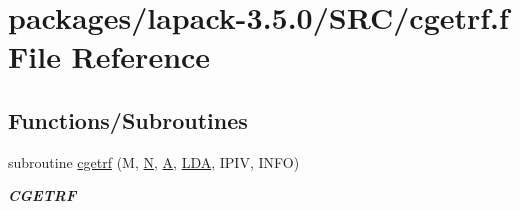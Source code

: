 \hypertarget{cgetrf_8f}{}\section{packages/lapack-\/3.5.0/\+S\+R\+C/cgetrf.f File Reference}
\label{cgetrf_8f}
\subsection*{Functions/\+Subroutines}
\begin{DoxyCompactItemize}
\item 
subroutine \hyperlink{group__complexGEcomputational_gaed8e85049ecfb314d259bfdb3908a60d}{cgetrf} (M, \hyperlink{polmisc_8c_a0240ac851181b84ac374872dc5434ee4}{N}, \hyperlink{classA}{A}, \hyperlink{example__user_8c_ae946da542ce0db94dced19b2ecefd1aa}{L\+D\+A}, I\+P\+I\+V, I\+N\+F\+O)
\begin{DoxyCompactList}\small\item\em {\bfseries C\+G\+E\+T\+R\+F} \end{DoxyCompactList}\end{DoxyCompactItemize}
